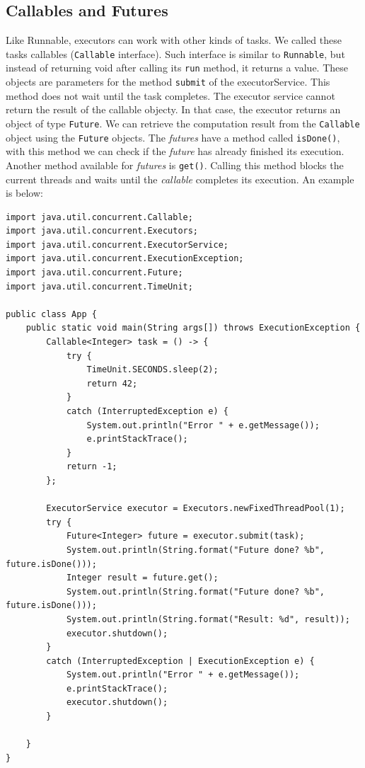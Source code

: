 \documentclass[openany, a4paper]{book}
\theoremstyle{break}
\theoremstyle{example}
\theoremstyle{note}
\theoremstyle{break}
\theoremstyle{exercise}
\begin{document}
\subsection{Callables and Futures}
\label{sec:orgf02ab0c}

Like Runnable, executors can work with other kinds of tasks. We called these
tasks callables (\texttt{Callable} interface). Such interface is similar to \texttt{Runnable},
but instead of returning void after calling its \texttt{run} method, it returns a
value. These objects are parameters for the method \texttt{submit} of the
executorService. This method does not wait until the task completes. The
executor service cannot return the result of the callable objecty. In that
case, the executor returns an object of type \texttt{Future}. We can retrieve the
computation result from the \texttt{Callable} object using the \texttt{Future} objects. The
\emph{futures} have a method called \texttt{isDone()}, with this method we can check if the
\emph{future} has already finished its execution. Another method available for
\emph{futures} is \texttt{get()}. Calling this method blocks the current threads and waits
until the \emph{callable} completes its execution. An example is below:


\begin{verbatim}
import java.util.concurrent.Callable;
import java.util.concurrent.Executors;
import java.util.concurrent.ExecutorService;
import java.util.concurrent.ExecutionException;
import java.util.concurrent.Future;
import java.util.concurrent.TimeUnit;

public class App {
    public static void main(String args[]) throws ExecutionException {
        Callable<Integer> task = () -> {
            try {
                TimeUnit.SECONDS.sleep(2);
                return 42;
            }
            catch (InterruptedException e) {
                System.out.println("Error " + e.getMessage());
                e.printStackTrace();
            }
            return -1;
        };

        ExecutorService executor = Executors.newFixedThreadPool(1);
        try {
            Future<Integer> future = executor.submit(task);
            System.out.println(String.format("Future done? %b", future.isDone()));
            Integer result = future.get();
            System.out.println(String.format("Future done? %b", future.isDone()));
            System.out.println(String.format("Result: %d", result));
            executor.shutdown();
        }
        catch (InterruptedException | ExecutionException e) {
            System.out.println("Error " + e.getMessage());
            e.printStackTrace();
            executor.shutdown();
        }

    }
}
\end{verbatim}
\end{document}
